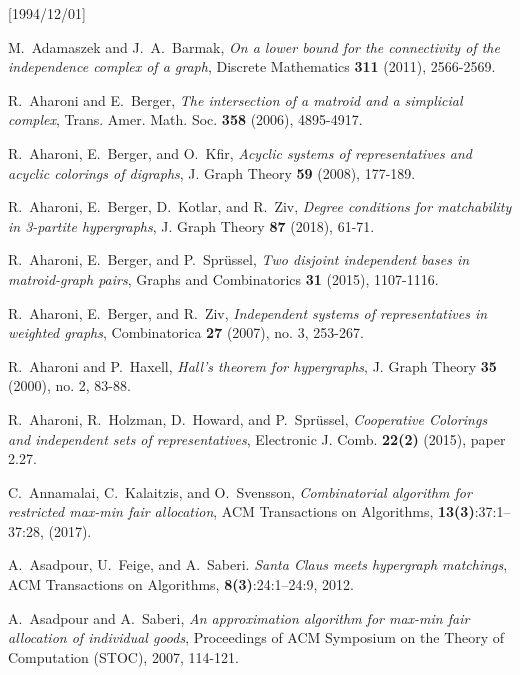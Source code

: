 \NeedsTeXFormat{LaTeX2e}[1994/12/01]\documentclass[letterpaper, 11pt]{article}
\theoremstyle{definition}
\theoremstyle{remark}
\numberwithin{equation}{section}
\begin{document}
\begin{thebibliography}{10}

M.~Adamaszek and J.~A.~Barmak, \emph{On a lower bound for the connectivity of the independence complex of a graph}, Discrete Mathematics \textbf{311} (2011), 2566-2569.

R.~Aharoni and E.~Berger, \emph{The intersection of a matroid and a
  simplicial complex}, Trans. Amer. Math. Soc. \textbf{358} (2006),
4895-4917.

R.~Aharoni, E.~Berger, and O.~Kfir, \emph{Acyclic systems of
  representatives and acyclic colorings of digraphs}, J. Graph Theory
\textbf{59} (2008), 177-189.  

R.~Aharoni, E.~Berger, D.~Kotlar, and R.~Ziv, \emph{Degree conditions for
matchability in 3-partite hypergraphs}, J. Graph Theory
\textbf{87} (2018), 61-71. 

R.~Aharoni, E.~Berger, and P.~Spr\"ussel, \emph{Two disjoint
  independent bases in matroid-graph pairs}, Graphs and Combinatorics \textbf{31} (2015), 1107-1116. 

R.~Aharoni, E.~Berger, and R.~Ziv, \emph{Independent systems of representatives in weighted graphs}, Combinatorica \textbf{27} (2007), no. 3, 253-267.

R.~Aharoni and P.~Haxell, \emph{Hall's theorem for hypergraphs}, J. Graph Theory \textbf{35} (2000), no. 2, 83-88.

R.~Aharoni, R.~Holzman, D.~Howard, and P.~Spr\"ussel,
\emph{Cooperative Colorings and independent sets of representatives},
Electronic J. Comb. \textbf{22(2)} (2015), paper 2.27. 

C.~Annamalai, C.~Kalaitzis, and O.~Svensson,  \emph{Combinatorial algorithm for restricted max-min
fair allocation}, ACM Transactions on Algorithms, \textbf{13(3)}:37:1–37:28, (2017).

A.~Asadpour, U.~Feige, and A.~Saberi. \emph{Santa Claus meets hypergraph
  matchings}, ACM 
Transactions on Algorithms, \textbf{8(3)}:24:1–24:9, 2012.

A.~Asadpour and A.~Saberi, \emph{An approximation algorithm for
  max-min fair allocation of individual goods}, Proceedings of ACM
Symposium on the Theory of Computation (STOC), 2007, 114-121.


\end{thebibliography}
\end{document}
